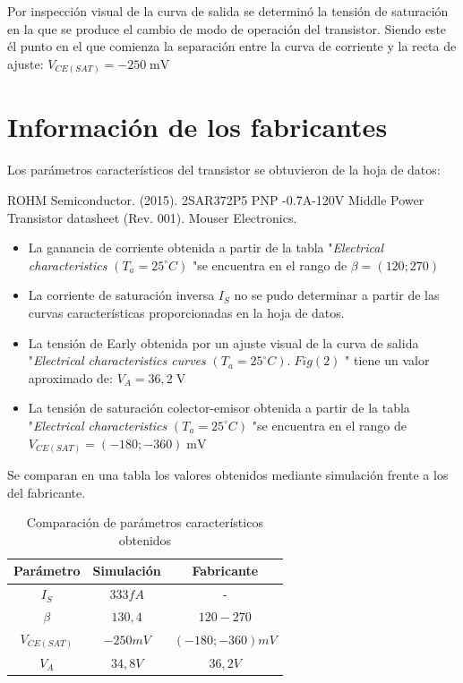 \documentclass[10pt]{article}
\begin{document}
Por inspección visual de la curva de salida se determinó la tensión de saturación en la que se produce el cambio de modo de operación del transistor. Siendo este él punto en el que comienza la separación entre la curva de corriente y la recta de ajuste: \; $V_{CE (SAT)} = -250 \; \mathrm{mV}$



\section{Información de los fabricantes}

Los parámetros característicos del transistor se obtuvieron de la hoja de datos: 

ROHM Semiconductor. (2015). 2SAR372P5 PNP -0.7A-120V Middle Power Transistor datasheet (Rev. 001). Mouser Electronics. 



\begin{itemize}
    \item La ganancia de corriente obtenida a partir de la tabla "\textit{Electrical characteristics} $(T_a = 25 ^\circ C)$ "\:se encuentra en el rango de $\beta = (120; 270)$ 

    \item La corriente de saturación inversa $I_S$ no se pudo determinar a partir de las curvas características proporcionadas en la hoja de datos.

    \item La tensión de Early obtenida por un ajuste visual de la curva de salida "\textit{Electrical characteristics curves} $(T_a = 25 ^\circ C). \; Fig(2)$ "\: tiene un valor aproximado de: $V_A = 36,2\; \mathrm{V}$

    \item La tensión de saturación colector-emisor obtenida a partir de la tabla "\textit{Electrical characteristics} $(T_a = 25 ^\circ C)$ "\:se encuentra en el rango de $V_{CE (SAT)} = (-180; -360)\; \mathrm{mV}$ 
\end{itemize}

Se comparan en una tabla los valores obtenidos mediante simulación frente a los del fabricante.

\begin{table}[H]
    \centering
    \begin{tabular}{c|c|c}
         \hline
         Parámetro & Simulación  &  Fabricante\\
         \hline
         $I_S$         &   $333fA$     &          -         \\
         $\beta$       &   $130,4$        &     $120-270$     \\
         $V_{CE(SAT)}$ &   $-250mV$     &     $(-180; -360) mV$     \\
         $V_{A}$       &   $34,8V$     &      $36,2V$    \\
         \hline
    \end{tabular}
    \caption{Comparación de parámetros característicos obtenidos}
    \label{tab:TablaROHMvSpice}
\end{table}
\end{document}
